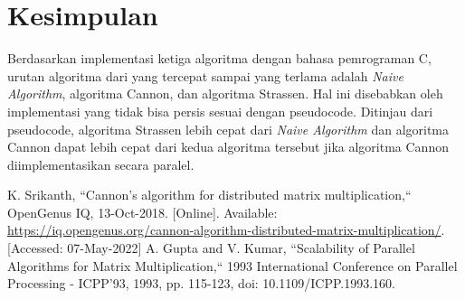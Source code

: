 \documentclass[conference]{IEEEtran}
\begin{document}
\section{Kesimpulan}
Berdasarkan implementasi ketiga algoritma dengan bahasa pemrograman C,
urutan algoritma dari yang tercepat sampai yang terlama adalah \textit{Naive Algorithm}, algoritma Cannon, dan algoritma Strassen.
Hal ini disebabkan oleh implementasi yang tidak bisa persis sesuai dengan pseudocode.
Ditinjau dari pseudocode, algoritma Strassen lebih cepat dari \textit{Naive Algorithm} dan algoritma Cannon dapat lebih cepat dari kedua algoritma tersebut
jika algoritma Cannon diimplementasikan secara paralel.

\begin{thebibliography}{00}
 K. Srikanth, ``Cannon's algorithm for distributed matrix multiplication,`` OpenGenus IQ, 13-Oct-2018. [Online]. Available: \href{https://iq.opengenus.org/cannon-algorithm-distributed-matrix-multiplication/}{https://iq.opengenus.org/cannon-algorithm-distributed-matrix-multiplication/}. [Accessed: 07-May-2022] 
 A. Gupta and V. Kumar, ``Scalability of Parallel Algorithms for Matrix Multiplication,`` 1993 International Conference on Parallel Processing - ICPP'93, 1993, pp. 115-123, doi: 10.1109/ICPP.1993.160.
\end{thebibliography}
\end{document}
